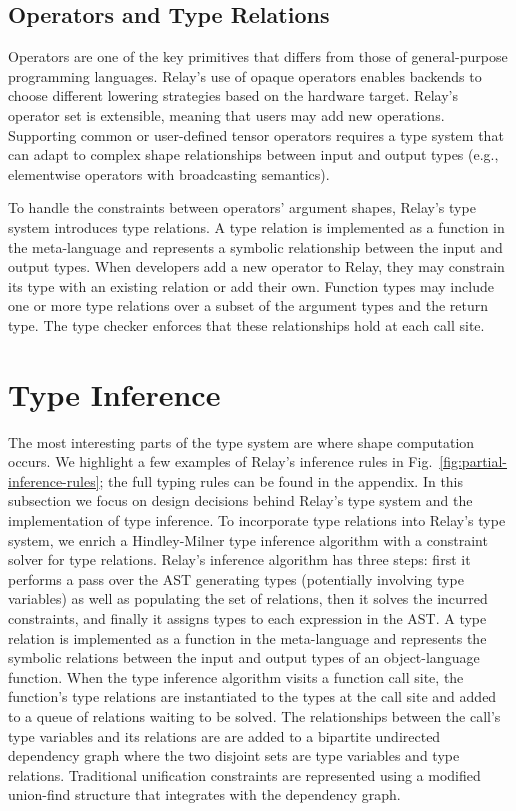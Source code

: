   \subsection*{Operators and Type Relations}
  Operators are one of the key primitives that differs from those of
    general-purpose programming languages.
  Relay's use of opaque operators enables backends to choose different
    lowering strategies based on the hardware target.
  Relay's operator set is extensible, meaning that users may add new operations.
  Supporting common or user-defined tensor operators requires a type system that can
    adapt to complex shape relationships between input and output types
    (e.g., elementwise operators with broadcasting semantics).

  To handle the constraints between operators' argument shapes, Relay's type system
    introduces type relations.
  A type relation is implemented as a function in the
    meta-language and represents a symbolic relationship between
    the input and output types.
  When developers add a new operator to Relay, they may constrain its
    type with an existing relation or add their own.
  Function types may include
    one or more type relations over a subset of the argument types and the return type.
  The type checker enforces that these relationships hold at each call site.

  \section{Type Inference}
  \label{sec:inference}

  The most interesting parts of the type system
    are where shape computation occurs.
  We highlight a few examples of Relay's inference
    rules in Fig.~\ref{fig:partial-inference-rules};
    the full typing rules can be found in the appendix.
  In this subsection we focus on design decisions behind Relay's type system
    and the implementation of type inference.
  To incorporate type relations into Relay's type system, we enrich
    a Hindley-Milner type inference algorithm with
    a constraint solver for type relations.
  Relay's inference algorithm has three steps: first it
    performs a pass over the AST generating types (potentially involving type variables)
    as well as populating the set of relations,
    then it solves the incurred constraints,
    and finally it assigns types to each expression in the AST.
  A type relation is implemented as a function in the
    meta-language and represents the symbolic relations between
    the input and output types of an object-language function.
  When the type inference algorithm visits a function call site, the function's type relations are
    instantiated to the types at the call site and added to a queue of relations waiting to be
    solved.
  The relationships between the call's type variables and its relations are are added to a
    bipartite undirected dependency graph where the two disjoint sets are type variables and type relations.
  Traditional unification constraints are represented using a modified union-find structure that
    integrates with the dependency graph.

